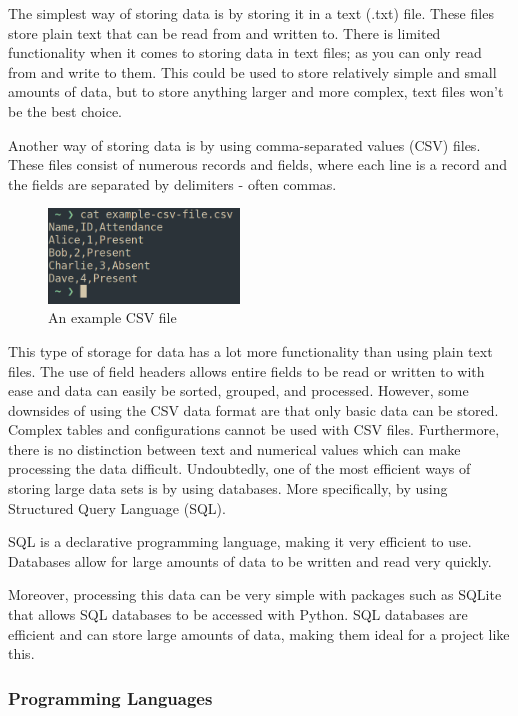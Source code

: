 \documentclass[12pt]{article}
\begin{document}
The simplest way of storing data is by storing it in a text (.txt) file. These files store plain text that can be read from and written to. There is limited functionality when it comes to storing data in text files; as you can only read from and write to them. This could be used to store relatively simple and small amounts of data, but to store anything larger and more complex, text files won't be the best choice.

Another way of storing data is by using comma-separated values (CSV) files. These files consist of numerous records and fields, where each line is a record and the fields are separated by delimiters  - often commas.

\begin{figure}
    \centering
    \captionsetup{justification=centering}
    \includegraphics[width=2.0in]{example-csv-file}
    \caption{An example CSV file}
\end{figure}

This type of storage for data has a lot more functionality than using plain text files. The use of field headers allows entire fields to be read or written to with ease and data can easily be sorted, grouped, and processed. However, some downsides of using the CSV data format are that only basic data can be stored. Complex tables and configurations cannot be used with CSV files. Furthermore, there is no distinction between text and numerical values which can make processing the data difficult.
\clearpage
 Undoubtedly, one of the most efficient ways of storing large data sets is by using databases. More specifically, by using Structured Query Language (SQL).

SQL is a declarative programming language, making it very efficient to use. Databases allow for large amounts of data to be written and read very quickly.

Moreover, processing this data can be very simple with packages such as SQLite that allows SQL databases to be accessed with Python. SQL databases are efficient and can store large amounts of data, making them ideal for a project like this.

\subsubsection{Programming Languages}
\end{document}
